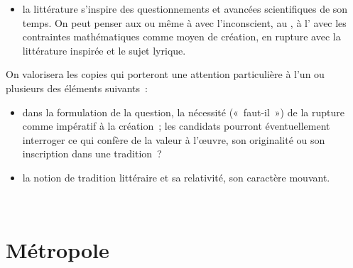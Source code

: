 {\begin{itemize}
\item la littérature s'inspire des questionnements et avancées scientifiques de son temps.
On peut penser aux  ou même à  avec l'inconscient, au , à l' avec les contraintes mathématiques comme moyen de
création, en rupture avec la littérature inspirée et le sujet lyrique.
\end{itemize}

On valorisera les copies qui porteront une attention particulière à l'un ou plusieurs des
éléments suivants~:

\begin{itemize}

\item dans la formulation de la question, la nécessité («~faut-il~») de la rupture comme
impératif à la création~; les candidats pourront éventuellement interroger ce qui confère
de la valeur à l'œuvre, son originalité ou son inscription dans une tradition~?

\item la notion de tradition littéraire et sa relativité, son caractère mouvant.

\end{itemize}}%

\vfill{~}\clearpage

\section{Métropole}

